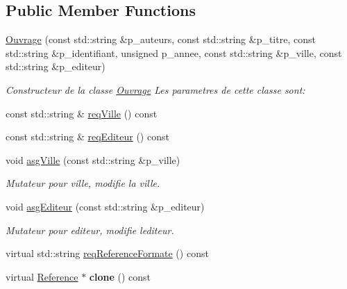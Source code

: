 \subsection*{Public Member Functions}
\begin{DoxyCompactItemize}
\item 
\hyperlink{classtp_1_1Ouvrage_a32d83af26a17b517d3188cca4c443b5e}{Ouvrage} (const std\+::string \&p\+\_\+auteurs, const std\+::string \&p\+\_\+titre, const std\+::string \&p\+\_\+identifiant, unsigned p\+\_\+annee, const std\+::string \&p\+\_\+ville, const std\+::string \&p\+\_\+editeur)
\begin{DoxyCompactList}\small\item\em Constructeur de la classe \hyperlink{classtp_1_1Ouvrage}{Ouvrage} Les parametres de cette classe sont\+: \end{DoxyCompactList}\item 
const std\+::string \& \hyperlink{classtp_1_1Ouvrage_aa25d4d5050ac2650a6a502b57b95f786}{req\+Ville} () const 
\item 
const std\+::string \& \hyperlink{classtp_1_1Ouvrage_a43319c7254bd4dec49437d1c78b914d0}{req\+Editeur} () const 
\item 
\hypertarget{classtp_1_1Ouvrage_a2547ac0a613d7583c06b4cc13f8abd9a}{}void \hyperlink{classtp_1_1Ouvrage_a2547ac0a613d7583c06b4cc13f8abd9a}{asg\+Ville} (const std\+::string \&p\+\_\+ville)\label{classtp_1_1Ouvrage_a2547ac0a613d7583c06b4cc13f8abd9a}

\begin{DoxyCompactList}\small\item\em Mutateur pour ville, modifie la ville. \end{DoxyCompactList}\item 
\hypertarget{classtp_1_1Ouvrage_a6a3762a00735d48498f1e406057a7678}{}void \hyperlink{classtp_1_1Ouvrage_a6a3762a00735d48498f1e406057a7678}{asg\+Editeur} (const std\+::string \&p\+\_\+editeur)\label{classtp_1_1Ouvrage_a6a3762a00735d48498f1e406057a7678}

\begin{DoxyCompactList}\small\item\em Mutateur pour editeur, modifie l\textquotesingle{}editeur. \end{DoxyCompactList}\item 
virtual std\+::string \hyperlink{classtp_1_1Ouvrage_a72a27ae3d11d41e3f02021c671e9a50a}{req\+Reference\+Formate} () const 
\item 
\hypertarget{classtp_1_1Ouvrage_a8e50d795c1e7d5b99dea1357e4282e12}{}virtual \hyperlink{classtp_1_1Reference}{Reference} $\ast$ {\bfseries clone} () const \label{classtp_1_1Ouvrage_a8e50d795c1e7d5b99dea1357e4282e12}

\end{DoxyCompactItemize}


